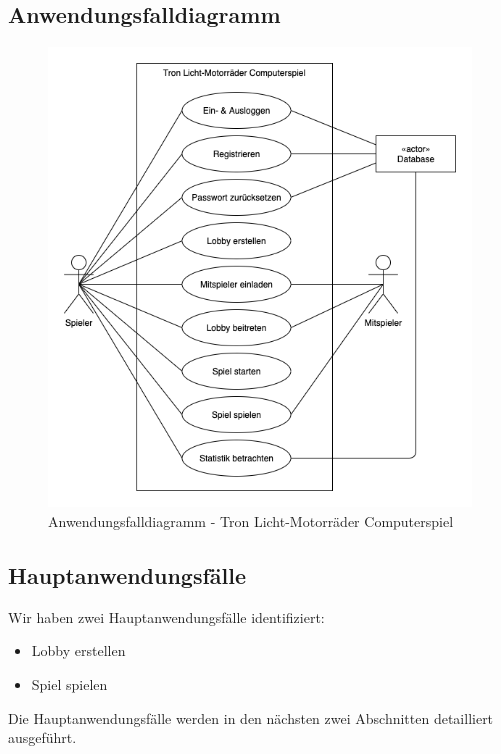 \documentclass[11pt,ngerman]{article}
\begin{document}
    \subsection{Anwendungsfalldiagramm}
        \begin{figure}[H]
            \includegraphics[scale=0.77]{figures/Use-case-modell.png}
            \caption{Anwendungsfalldiagramm - Tron Licht-Motorräder Computerspiel}
        \end{figure}

    \subsection{Hauptanwendungsfälle}
        Wir haben zwei Hauptanwendungsfälle identifiziert:
         \begin{itemize}
            \item Lobby erstellen
            \item Spiel spielen
        \end{itemize}
        Die Hauptanwendungsfälle werden in den nächsten zwei Abschnitten detailliert ausgeführt.
\end{document}

